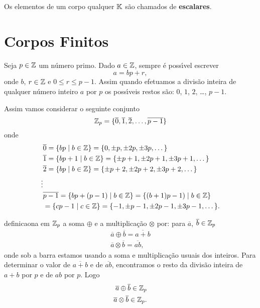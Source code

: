 \begin{observacao}
	Os elementos de um corpo qualquer $\mathbb{K}$ s\~ao chamados de \textbf{escalares}.
\end{observacao}

\section{Corpos Finitos}\label{sec:corpor_finitos}

Seja $p \in \mathbb{Z}$ um n\'umero primo. Dado $a \in \mathbb{Z}$, sempre \'e poss{\'\i}vel escrever
\[
a = bp + r,
\]
onde $b$, $r \in \mathbb{Z}$ e $0 \le r \le p - 1$. Assim quando efetuamos a divis\~ao inteira de qualquer n\'umero inteiro $a$ por $p$ os poss{\'\i}veis restos s\~ao: $0$, 
$1$, $2$, \dots, $p -1 $.

Assim vamos considerar o seguinte conjunto
\[
\mathbb{Z}_p = \{\overline{0}, \overline{1}, \overline{2}, \dots, \overline{p - 1}\}
\]
onde
\begin{align*}
	&\overline{0} = \{bp \mid b \in \mathbb{Z}\} = \{0, \pm p, \pm 2p, \pm 3p, \dots\}\\
	&\overline{1} = \{bp + 1\mid b \in \mathbb{Z}\} = \{\pm p + 1, \pm 2p + 1, \pm 3p + 1, \dots\}\\
	&\overline{2} = \{bp \mid b \in \mathbb{Z}\} = \{\pm p + 2, \pm 2p + 2, \pm 3p + 2, \dots\}\\
	\vdots\\
	&\overline{p - 1} = \{bp + (p - 1) \mid b \in \mathbb{Z}\} = \{(b + 1)p - 1) \mid b \in \mathbb{Z}\}\\ &= \{cp - 1 \mid c \in \mathbb{Z}\} = \{-1, \pm p - 1, \pm 2p - 1, \pm 3p - 1, \dots\}.
\end{align*}

definicaona em $\mathbb{Z}_p$ a soma $\oplus$ e a multiplica\c{c}\~ao $\otimes$ por: para $\overline{a}$, $\overline{b} \in \mathbb{Z}_p$
\begin{align*}
	\overline{a} \oplus \overline{b} = \overline{a + b}\\
	\overline{a} \otimes \overline{b} = \overline{ab},
\end{align*}
onde sob a barra estamos usando a soma e multiplica\c{c}\~ao usuais dos inteiros. Para determinar o valor de $\overline{a + b}$ e de $\overline{ab}$, encontramos o resto da divis\~ao inteira de $a + b$ por $p$ e de $ab$ por $p$. Logo
\begin{align*}
	\overline{a} \oplus \overline{b} \in \mathbb{Z}_p\\
	\overline{a} \otimes \overline{b} \in \mathbb{Z}_p.
\end{align*}

